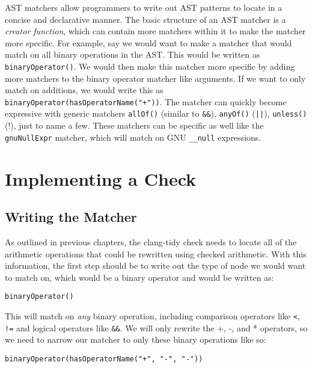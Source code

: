 AST matchers allow programmers to write out AST patterns to locate in a concise and declarative manner. The basic structure of an AST matcher is a \textit{creator function}, which can contain more matchers within it to make the matcher more specific. For example, say we would want to make a matcher that would match on all binary operations in the AST. This would be written as \texttt{binaryOperator()}. We would then make this matcher more specific by adding more matchers to the binary operator matcher like arguments. If we want to only match on additions, we would write this as \texttt{binaryOperator(hasOperatorName("+"))}. The matcher can quickly become expressive with generic matchers \texttt{allOf()} (similar to \texttt{\&\&}), \texttt{anyOf()} (\texttt{||}), \texttt{unless()} (!), just to name a few. These matchers can be specific as well like the \texttt{gnuNullExpr} matcher, which will match on GNU \texttt{\_\_null} expressions.

\section{Implementing a Check}

\subsection{Writing the Matcher}

As outlined in previous chapters, the clang-tidy check needs to locate all of the arithmetic operations that could be rewritten using checked arithmetic. With this information, the first step should be to write out the type of node we would want to match on, which would be a binary operator and would be written as:
\begin{center}
\texttt{binaryOperator()}
\end{center}

This will match on \textit{any} binary operation, including comparison operators like \texttt{<}, \texttt{!=} and logical operators like \texttt{\&\&}. We will only rewrite the +, -, and * operators, so we need to narrow our matcher to only these binary operations like so:
\begin{center}
\texttt{binaryOperator(hasOperatorName("+", "-", "-"))}
\end{center}

